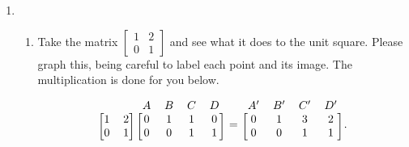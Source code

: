 \documentclass[../gatm.tex]{subfiles}
\begin{document}
\begin{enumerate}
\setcounter{enumi}{\value{mp_problem_i}}
\item \begin{enumerate}
\item Take the matrix $\left[\begin{smallmatrix}1 & 2 \\ 0 & 1\end{smallmatrix}\right]$ and see what it does to the unit square. Please graph this, being careful to label each point and its image. The multiplication is done for you below.

$$\begin{blockarray}{cccccc}
& & A & B & C & D \\
\begin{block}{[cc][cccc]}
1 & 2 & 0 & 1 & 1 & 0 \\
0 & 1 & 0 & 0 & 1 & 1 \\
\end{block}
\end{blockarray} =
\begin{blockarray}{cccc}
A' & B' & C' & D' \\
\begin{block}{[cccc]}
0 & 1 & 3 & 2 \\
0 & 0 & 1 & 1 \\
\end{block}
\end{blockarray}.$$


\end{enumerate}
\end{enumerate}
\end{document}

